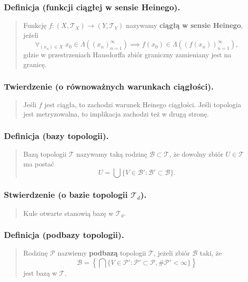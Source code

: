 \documentclass[10pt,a4paper]{article}
\begin{document}
{    \subsubsection*{Definicja (funkcji ciągłej w sensie Heinego).}
    \begin{quote}
    Funkcję $f : (X, \mathcal{T}_X) \to (Y, \mathcal{T}_Y)$ nazywamy \textbf{ciągłą w sensie Heinego}, jeżeli \\
    $$\forall_{(x_n) \in X} \; x_0 \in \Lambda((x_n)_{n=1}^{\infty}) \implies f(x_0) \in \Lambda((f(x_n))_{n=1}^{\infty}),$$
    gdzie w przestrzeniach Hausdorffa zbiór graniczny zamieniany jest na granicę.
    \end{quote}

    \subsubsection*{Twierdzenie (o równoważnych warunkach ciągłości).}
    \begin{quote}
    Jeśli $f$ jest ciągła, to zachodzi warunek Heinego ciągłości. Jeśli topologia jest metryzowalna, to implikacja zachodzi też w drugą stronę.
    \end{quote}

    \subsubsection*{Definicja (bazy topologii).}
    \begin{quote}
    Bazą topologii $\mathcal{T}$ nazywamy taką rodzinę $\mathcal{B} \subset \mathcal{T}$, że dowolny zbiór $U \in \mathcal{T}$ ma postać \\
    $$U = \bigcup \{V \in \mathcal{B}' : \mathcal{B}' \subset \mathcal{B}\}.$$
    \end{quote}

    \subsubsection*{Stwierdzenie (o bazie topologii $\mathcal{T}_d$).}
    \begin{quote}
    Kule otwarte stanowią bazę w $\mathcal{T}_d$.
    \end{quote}

    \subsubsection*{Definicja (podbazy topologii).}
    \begin{quote}
    Rodzinę $\mathcal{P}$ nazwiemy \textbf{podbazą} topologii $\mathcal{T}$, jeżeli zbiór $\mathcal{B}$ taki, że \\
    $$\mathcal{B} = \left\{\bigcap \{V \in \mathcal{P}' : \mathcal{P}' \subset \mathcal{P}, \#\mathcal{P}' < \infty\}\right\}$$
    jest bazą w $\mathcal{T}$.
    \end{quote}

}
\end{document}
